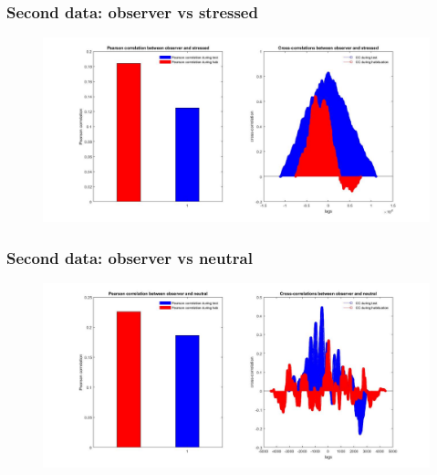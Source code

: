 \documentclass{beamer}
\begin{document}
\begin{frame}
\frametitle{Second data: observer vs stressed}





\begin{figure}[H]
	\begin{center}
		\hspace*{-1cm}
		\includegraphics[scale=.30]{obs_vs_stress2.jpg} 
	\end{center}  
	
	
\end{figure}


\end{frame}	

\begin{frame}
\frametitle{Second data: observer vs neutral}





\begin{figure}[H]
\begin{center}
	\hspace*{-1cm}
	\includegraphics[scale=.30]{obs_neut2.jpg} 
\end{center}  


\end{figure}


\end{frame}	
\end{document}
